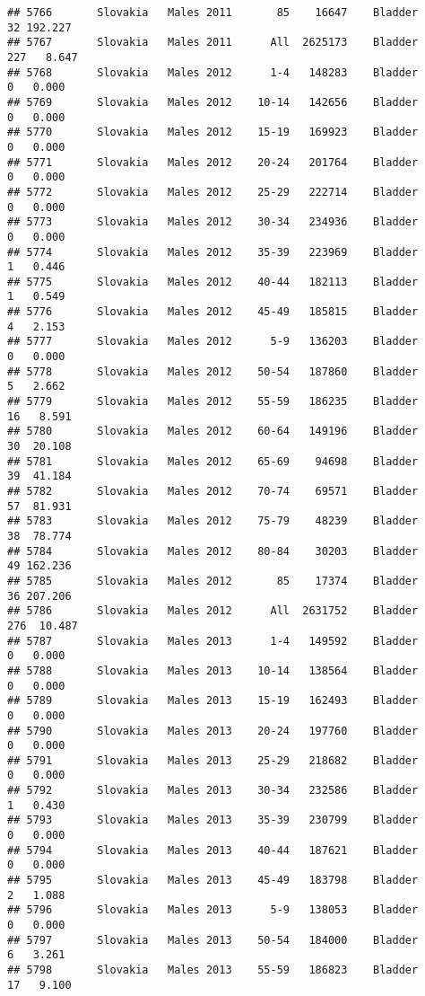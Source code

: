 \documentclass[
]{article}
\begin{document}
\begin{verbatim}
## 5766       Slovakia   Males 2011       85    16647    Bladder     32 192.227
## 5767       Slovakia   Males 2011      All  2625173    Bladder    227   8.647
## 5768       Slovakia   Males 2012      1-4   148283    Bladder      0   0.000
## 5769       Slovakia   Males 2012    10-14   142656    Bladder      0   0.000
## 5770       Slovakia   Males 2012    15-19   169923    Bladder      0   0.000
## 5771       Slovakia   Males 2012    20-24   201764    Bladder      0   0.000
## 5772       Slovakia   Males 2012    25-29   222714    Bladder      0   0.000
## 5773       Slovakia   Males 2012    30-34   234936    Bladder      0   0.000
## 5774       Slovakia   Males 2012    35-39   223969    Bladder      1   0.446
## 5775       Slovakia   Males 2012    40-44   182113    Bladder      1   0.549
## 5776       Slovakia   Males 2012    45-49   185815    Bladder      4   2.153
## 5777       Slovakia   Males 2012      5-9   136203    Bladder      0   0.000
## 5778       Slovakia   Males 2012    50-54   187860    Bladder      5   2.662
## 5779       Slovakia   Males 2012    55-59   186235    Bladder     16   8.591
## 5780       Slovakia   Males 2012    60-64   149196    Bladder     30  20.108
## 5781       Slovakia   Males 2012    65-69    94698    Bladder     39  41.184
## 5782       Slovakia   Males 2012    70-74    69571    Bladder     57  81.931
## 5783       Slovakia   Males 2012    75-79    48239    Bladder     38  78.774
## 5784       Slovakia   Males 2012    80-84    30203    Bladder     49 162.236
## 5785       Slovakia   Males 2012       85    17374    Bladder     36 207.206
## 5786       Slovakia   Males 2012      All  2631752    Bladder    276  10.487
## 5787       Slovakia   Males 2013      1-4   149592    Bladder      0   0.000
## 5788       Slovakia   Males 2013    10-14   138564    Bladder      0   0.000
## 5789       Slovakia   Males 2013    15-19   162493    Bladder      0   0.000
## 5790       Slovakia   Males 2013    20-24   197760    Bladder      0   0.000
## 5791       Slovakia   Males 2013    25-29   218682    Bladder      0   0.000
## 5792       Slovakia   Males 2013    30-34   232586    Bladder      1   0.430
## 5793       Slovakia   Males 2013    35-39   230799    Bladder      0   0.000
## 5794       Slovakia   Males 2013    40-44   187621    Bladder      0   0.000
## 5795       Slovakia   Males 2013    45-49   183798    Bladder      2   1.088
## 5796       Slovakia   Males 2013      5-9   138053    Bladder      0   0.000
## 5797       Slovakia   Males 2013    50-54   184000    Bladder      6   3.261
## 5798       Slovakia   Males 2013    55-59   186823    Bladder     17   9.100

\end{verbatim}
\end{document}
